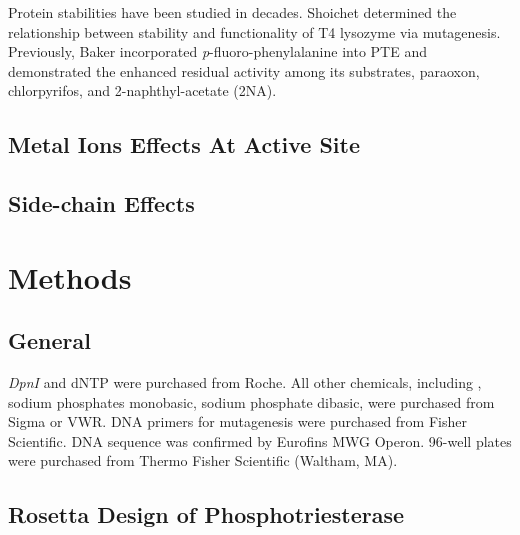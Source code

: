 \begin{refsection}
Protein stabilities have been studied in decades. Shoichet 
determined the relationship between stability and functionality of T4 lysozyme
via mutagenesis\cite{Shoichet1995}. Previously, Baker 
incorporated \emph{p}-fluoro-phenylalanine into PTE and demonstrated the
enhanced residual activity among its substrates, paraoxon, chlorpyrifos, and
2-naphthyl-acetate (2NA)\cite{Baker2011b}.  

\subsection{Metal Ions Effects At Active Site}

\subsection{Side-chain Effects}
\label{sec:side-chain}

\section{Methods}

\subsection{General}

\emph{DpnI} and dNTP were purchased from Roche. All other chemicals, including
, sodium phosphates monobasic, sodium phosphate dibasic, were
purchased from Sigma or VWR. DNA primers for mutagenesis were purchased from
Fisher Scientific. DNA sequence was confirmed by Eurofins MWG Operon.  96-well
plates were purchased from Thermo Fisher Scientific (Waltham,
MA)\cite{Yang2014a}.

\subsection{Rosetta Design of Phosphotriesterase}


\end{refsection}
